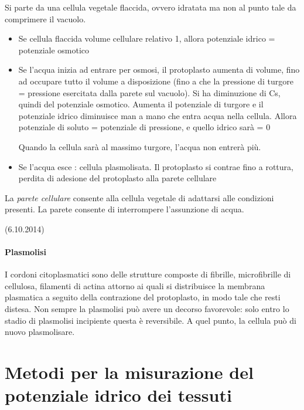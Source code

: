 \documentclass[a4paper,12pt]{book}
\begin{document}
Si parte da una cellula vegetale flaccida, ovvero idratata ma non al punto tale da comprimere il vacuolo. 
\begin{itemize}
\item{Se cellula flaccida volume cellulare relativo 1, allora potenziale idrico = potenziale osmotico}
\item{Se l'acqua inizia ad entrare per osmosi, il protoplasto aumenta di volume, fino ad occupare tutto il volume a disposizione (fino a che la pressione di turgore = pressione esercitata dalla parete sul vacuolo). Si ha diminuzione di Cs, quindi del potenziale osmotico. Aumenta il potenziale di turgore  e il potenziale idrico diminuisce man a mano che entra acqua nella cellula. Allora potenziale di soluto = potenziale di pressione, e quello idrico sarà = 0

Quando la cellula sarà al massimo turgore, l'acqua non entrerà più.}
\item{Se l'acqua esce : cellula plasmolisata. Il protoplasto si contrae fino a rottura, perdita di adesione del protoplasto alla parete cellulare}
\end{itemize}

La \emph{parete cellulare} consente alla cellula vegetale di adattarsi alle condizioni presenti. La parete consente di interrompere l'assunzione di acqua.

(6.10.2014)

\paragraph{Plasmolisi}
 I cordoni citoplasmatici sono delle strutture composte di fibrille, microfibrille di cellulosa, filamenti di actina attorno ai quali si distribuisce la membrana plasmatica a seguito della contrazione del protoplasto, in modo tale che resti distesa.
Non sempre la plasmolisi può avere un decorso favorevole: solo entro lo stadio di plasmolisi incipiente questa è reversibile. A quel punto, la cellula può di nuovo plasmolisare.

\section{Metodi per la misurazione del potenziale idrico dei tessuti}
\end{document}
